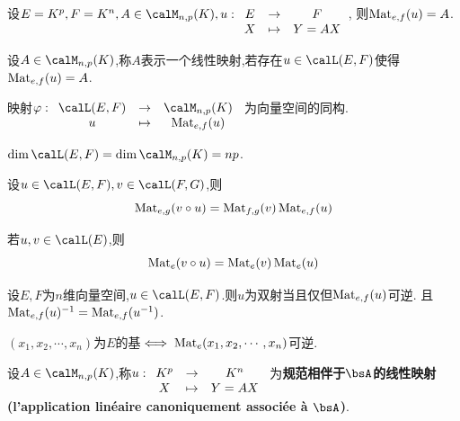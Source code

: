 \begin{prop}
    设$E = K^p, F = K^n, A \in \calM_{n, p}(K),u: \begin{array}[t]{ccc} E & \to & F \\ X & \tp & Y = AX \end{array}$,
    则$\operatorname{Mat}_{e, f}(u) = A$.
\end{prop}

\begin{deff}
    设$A \in \calM_{n, p}(K)$,称$A$表示一个线性映射,若存在$u \in \calL(E, F)$使得$\operatorname{Mat}_{e, f}(u) = A$.
\end{deff}

\begin{prop}
    映射$\varphi: \begin{array}[t]{ccc} \calL(E, F) & \to & \calM_{n, p}(K) \\ u & \tp & \mat_{e, f}(u) \end{array}$
    为向量空间的同构.
\end{prop}

\begin{cor}
    $\dim \calL(E, F) = \dim \calM_{n, p}(K) = np$.
\end{cor}

\begin{prop}
    设$u \in \calL(E, F), v \in \calL(F, G)$,则
    \[ \operatorname{Mat}_{e, g}(v \circ u) = \operatorname{Mat}_{f, g}(v) \operatorname{Mat}_{e, f}(u) \]
\end{prop}

\begin{rqq}
    若$u, v \in \calL(E)$,则
    \[ \operatorname{Mat}_e(v \circ u) = \operatorname{Mat}_e(v) \operatorname{Mat}_e(u) \]
\end{rqq}

\begin{prop}
    设$E, F$为$n$维向量空间,$u \in \calL(E, F)$.则$u$为双射当且仅但$\operatorname{Mat}_{e, f}(u)$可逆.
    且$\operatorname{Mat}_{e, f}(u)^{-1} = \operatorname{Mat}_{e, f}(u^{-1})$.
\end{prop}

\begin{prop}
    $(x_1, x_2, \cdots, x_n)$为$E$的基$\iff \operatorname{Mat}_e(x_1, x_2, \cdots, x_n)$可逆.
\end{prop}

\begin{deff}
    设$A \in \calM_{n, p}(K)$,称$u: \begin{array}[t]{ccc} K^p & \to & K^n \\ X & \mapsto & Y = AX \end{array}$
    为\textbf{规范相伴于$\bsA$的线性映射(l'application linéaire canoniquement associée à $\bsA$)}.
\end{deff}

